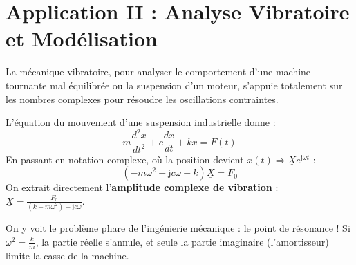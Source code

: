 \documentclass[11pt,a4paper]{article}
\newcommand{\jc}{\mathrm{j}} %
\newcommand{\cpx}[1]{\underline{#1}} %
\begin{document}
\section{Application II : Analyse Vibratoire et Modélisation}

La mécanique vibratoire, pour analyser le comportement d'une machine tournante mal équilibrée ou la suspension d'un moteur, s'appuie totalement sur les nombres complexes pour résoudre les oscillations contraintes.

\begin{center}
\end{center}

L'équation du mouvement d'une suspension industrielle donne :
\[ m \frac{d^2x}{dt^2} + c \frac{dx}{dt} + k x = F(t) \]
En passant en notation complexe, où la position devient $x(t) \Rightarrow \cpx{X}e^{\jc\omega t}$ :
\[ (-m\omega^2 + \jc c\omega + k)\cpx{X} = F_0 \]
On extrait directement l'\textbf{amplitude complexe de vibration} : $\cpx{X} = \frac{F_0}{(k - m\omega^2) + \jc c\omega}$.

On y voit le problème phare de l'ingénierie mécanique : le point de résonance ! Si $\omega^2 = \frac{k}{m}$, la partie réelle s'annule, et seule la partie imaginaire (l'amortisseur) limite la casse de la machine.
\end{document}

